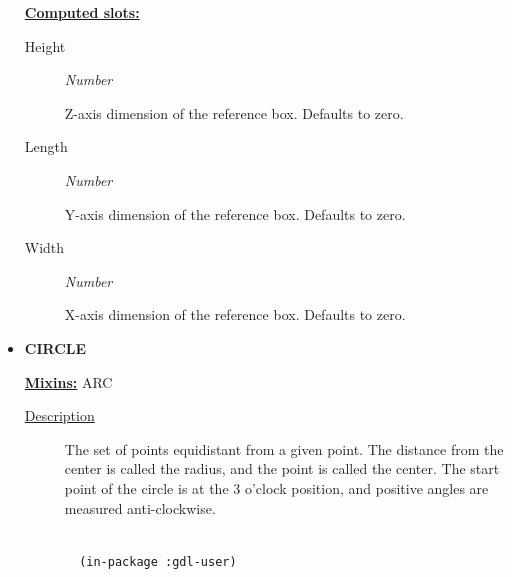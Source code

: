 \documentclass [11pt]{book}
\begin{document}
\begin{itemize}
\textbf{
\underline{Computed slots:}}

\begin{description}

\item [Height]
\emph{Number}

 Z-axis dimension of the reference box. Defaults to zero.




\item [Length]
\emph{Number}

 Y-axis dimension of the reference box. Defaults to zero.




\item [Width]
\emph{Number}

 X-axis dimension of the reference box. Defaults to zero.




\end{description}







\item {}
\label{prim:circle}
\textbf{CIRCLE}


\textbf{
\underline{Mixins:}} ARC





\begin{description}

\item [
\underline{Description}]


The set of points equidistant from a given point. 
The distance from the center is called the radius, and the point is called 
the center. The start point of the circle is at the 3 o'clock position, and positive
angles are measured anti-clockwise.



\end{description}




\begin{figure}
\begin{lrbox}{\boxedverb}
\begin{minipage}{\linewidth}
{\small

\begin{verbatim}

  (in-package :gdl-user)
                  

\end{verbatim}}
\end{minipage}
\end{lrbox}
\end{figure}
\end{itemize}
\end{document}
